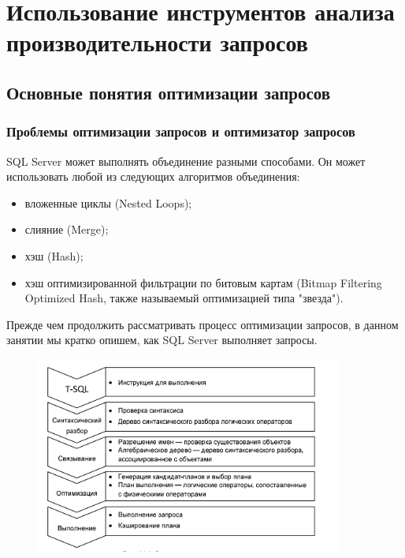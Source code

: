 \chapter{Использование инструментов анализа производительности запросов}
\section{Основные понятия оптимизации запросов}
\subsection{Проблемы оптимизации запросов и оптимизатор запросов}

SQL Server может выполнять объединение разными способами. Он может использовать любой из следующих алгоритмов объединения: 

\begin{itemize}
	\item вложенные циклы (Nested Loops); 
	\item слияние (Merge); 
	\item хэш (Hash); 
	\item хэш оптимизированной фильтрации по битовым картам (Bitmap Filtering
	Optimized Hash, также называемый оптимизацией типа "звезда"). 
\end{itemize}


Прежде чем продолжить рассматривать процесс оптимизации запросов, в данном
занятии мы кратко опишем, как SQL Server выполняет запросы. 

\begin{figure}[h!]
	\begin{center}
		\includegraphics[width=0.9\textwidth]{img/stages2.png}
	\end{center}
	\captionsetup{justification=centering}
\end{figure}

